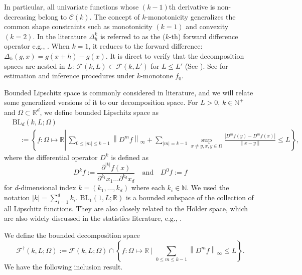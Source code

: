 \documentclass[12pt]{article}
\begin{document}
In particular, all univariate functions whose $(k-1)$th derivative is non-decreasing belong to $\mathcal{C}(k)$. The concept of $k$-monotonicity generalizes the common shape constraints such as monotonicity $(k=1)$ and convexity $(k=2)$. In the literature $\Delta_h^k$ is referred to as the ($k$-th) forward difference operator e.g., \cite[section 1.1]{ditzian2012moduli}. When $k=1$, it reduces to the forward difference: $\Delta_h(g,x) = g(x+h)-g(x)$. It is direct to verify that the decomposition spaces are nested in $L$: $\mathcal{F}(k,L)\subset \mathcal{F}(k,L')$ for $L \leq L'$ (See ). See \cite{meyer2008inference} for estimation and inference procedures under $k$-monotone $f_0$.

Bounded Lipschitz space is commonly considered in literature, and we will relate some generalized versions of it to our decomposition space. For $L>0$, $k \in \mathbb{N}^+$ and $\Omega \subset \mathbb{R}^d$, we define bounded Lipschitz space as
    \begin{equation}\label{eq:Bounded-Lipschitz-space}
\begin{aligned}
& \mathrm{BL}_d(k, L ; \Omega) \\
& \quad:=\left\{f: \Omega \mapsto \mathbb{R} \left\lvert\, \sum_{0 \leq|m| \leq k-1}\left\|D^m f\right\|_{\infty}
+\sum_{|m|=k-1} \sup _{x \neq y, x, y \in \Omega} \frac{\left|D^m f(y)-D^m f(x)\right|}{\|x-y\|} \leq L\right.\right\},
\end{aligned}
\end{equation}
where the differential operator $D^k$ is defined as 
\begin{equation*}
D^k f:=\frac{\partial^{|k|} f(x)}{\partial^{k_1} x_1 \ldots \partial^{k_d} x_d} \quad \text{and}\quad D^0 f:=f
\end{equation*}
for $d$-dimensional index $k = (k_1,\ldots,k_d)$ where each $k_i \in\mathbb{N}$. We used the notation
$|k|= \sum_{i=1}^d k_i$. $\mathrm{BL}_1(1, L;\mathbb{R})$ is a bounded subspace of the collection of all Lipschitz functions. They are also closely related to the H\"{o}lder space, which are also widely discussed in the statistics literature, e.g., \citep[Equation (4.113)]{gine2021mathematical}.

We define the bounded decomposition space 
\begin{equation}\label{eq:F-dag-definition}
\mathcal{F}^{\dagger}(k, L;\Omega):=\mathcal{F}(k, L;\Omega) \cap\left\{f:\Omega\mapsto\mathbb{R}\mid \sum_{0 \leq m \leq k-1}\left\|D^m f\right\|_{\infty}\leq L\right\}.
\end{equation}
We have the following inclusion result. 
\end{document}
